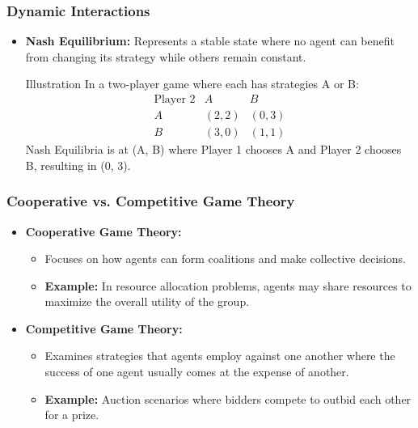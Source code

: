 \documentclass[aspectratio=169]{beamer}
\begin{document}
\begin{frame}[fragile]
    \frametitle{Dynamic Interactions}
    \begin{itemize}
        \item \textbf{Nash Equilibrium:} Represents a stable state where no agent can benefit from changing its strategy while others remain constant.
        \begin{block}{Illustration}
            In a two-player game where each has strategies A or B:
            \begin{equation}
                \begin{array}{c|c|c}
                    \text{Player 2} & A & B \\
                    \hline
                    A & (2, 2) & (0, 3) \\
                    B & (3, 0) & (1, 1)
                \end{array}
            \end{equation}
            Nash Equilibria is at (A, B) where Player 1 chooses A and Player 2 chooses B, resulting in (0, 3).
        \end{block}
    \end{itemize}
\end{frame}

\begin{frame}[fragile]
    \frametitle{Cooperative vs. Competitive Game Theory}
    \begin{itemize}
        \item \textbf{Cooperative Game Theory:}
        \begin{itemize}
            \item Focuses on how agents can form coalitions and make collective decisions.
            \item \textbf{Example:} In resource allocation problems, agents may share resources to maximize the overall utility of the group.
        \end{itemize}
        
        \item \textbf{Competitive Game Theory:}
        \begin{itemize}
            \item Examines strategies that agents employ against one another where the success of one agent usually comes at the expense of another.
            \item \textbf{Example:} Auction scenarios where bidders compete to outbid each other for a prize.
        \end{itemize}
    \end{itemize}
\end{frame}
\end{document}
